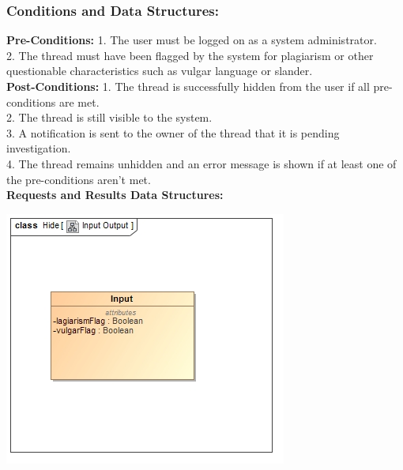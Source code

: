 \documentclass[a4paper,11pt]{article}
\begin{document}
\subsubsection{Conditions and Data Structures:}
\textbf{Pre-Conditions:}
1.	The user must be logged on as a system administrator.\\
2.	The thread must have been flagged by the system for plagiarism or other questionable characteristics such as vulgar language or slander.\\
\textbf{Post-Conditions:}
1.	The thread is successfully hidden from the user if all pre-conditions are met.\\
2.	The thread is still visible to the system.\\
3.	A notification is sent to the owner of the thread that it is pending investigation.\\
4.	The thread remains unhidden and an error message is shown if at least one of the pre-conditions aren't met.\\
\textbf{Requests and Results Data Structures:}
\begin{center}
\includegraphics[width=0.7\linewidth]{Images/SCHMThread/HideInOut.jpg}\\
\end{center}
\end{document}

